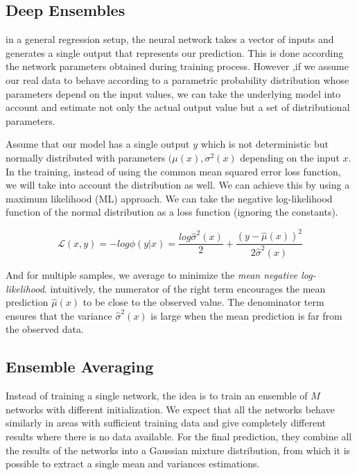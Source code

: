 \subsection{Deep Ensembles}
in a general regression setup, the neural network takes a vector of inputs and generates a single output that represents our prediction. This is done according the network parameters obtained during training process. However ,if we assume our real data to behave according to a parametric probability distribution whose parameters depend on the input values, we can take the underlying model into account and estimate not only the actual output value but a set of distributional parameters.

Assume that our model has a single output $y$ which is not deterministic but normally distributed with parameters $(\mu(x), \sigma^2(x)$ depending on the input $x$. In the training, instead of using the common mean squared error loss function, we will take into account the distribution as well. We can achieve this by using a maximum likelihood (ML) approach. We can take the negative log-likelihood function of the normal distribution as a loss function (ignoring the constants).

\begin{equation}
    \mathcal{L}(x, y) = -log \phi(y|x) = \frac{log \hat{\sigma}^2(x)}{2}+\frac{(y-\hat{\mu}(x))^2}{2\hat{\sigma}^2(x)}
\end{equation}

And for multiple samples, we average to minimize the \textit{mean negative log-likelihood}.
intuitively, the numerator of the right term encourages the mean prediction $\hat{\mu}(x)$ to be close to the observed value. The denominator term ensures that the variance $\hat{\sigma}^2(x)$ is large when the mean prediction is far from the observed data.

\subsection{Ensemble Averaging}

Instead of training a single network, the idea is to train an ensemble of $M$ networks with different initialization. We expect that all the networks behave similarly in areas with sufficient training data and give completely different results where there is no data available.
For the final prediction, they combine all the results of the networks into a Gaussian mixture distribution, from which it is possible to extract a single mean and variances estimations.

